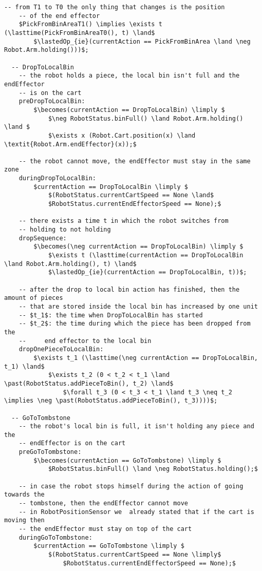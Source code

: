 \begin{lstlisting}[fontadjust, mathescape, frame=single]
    -- from T1 to T0 the only thing that changes is the position
    -- of the end effector
    $PickFromBinAreaT1() \implies \exists t (\lasttime(PickFromBinAreaT0(), t) \land$
        $\lastedOp_{ie}(currentAction == PickFromBinArea \land \neg Robot.Arm.holding()))$;
      
  -- DropToLocalBin
    -- the robot holds a piece, the local bin isn't full and the endEffector 
    -- is on the cart
    preDropToLocalBin:
        $\becomes(currentAction == DropToLocalBin) \limply $
            $\neg RobotStatus.binFull() \land Robot.Arm.holding() \land $
            $\exists x (Robot.Cart.position(x) \land \textit{Robot.Arm.endEffector}(x));$
    
    -- the robot cannot move, the endEffector must stay in the same zone
    duringDropToLocalBin:
        $currentAction == DropToLocalBin \limply $
            $(RobotStatus.currentCartSpeed == None \land$
            $RobotStatus.currentEndEffectorSpeed == None);$
  
    -- there exists a time t in which the robot switches from 
    -- holding to not holding
    dropSequence:
        $\becomes(\neg currentAction == DropToLocalBin) \limply $
            $\exists t (\lasttime(currentAction == DropToLocalBin \land Robot.Arm.holding(), t) \land$
            $\lastedOp_{ie}(currentAction == DropToLocalBin, t))$;

    -- after the drop to local bin action has finished, then the amount of pieces
    -- that are stored inside the local bin has increased by one unit
    -- $t_1$: the time when DropToLocalBin has started
    -- $t_2$: the time during which the piece has been dropped from the
    --     end effector to the local bin
    dropOnePieceToLocalBin:
        $\exists t_1 (\lasttime(\neg currentAction == DropToLocalBin, t_1) \land$
            $\exists t_2 (0 < t_2 < t_1 \land \past(RobotStatus.addPieceToBin(), t_2) \land$
                $\forall t_3 (0 < t_3 < t_1 \land t_3 \neq t_2 \implies \neg \past(RobotStatus.addPieceToBin(), t_3))))$;

  -- GoToTombstone
    -- the robot's local bin is full, it isn't holding any piece and the 
    -- endEffector is on the cart
    preGoToTombstone:
        $\becomes(currentAction == GoToTombstone) \limply $
            $RobotStatus.binFull() \land \neg RobotStatus.holding();$
    
    -- in case the robot stops himself during the action of going towards the 
    -- tombstone, then the endEffector cannot move 
    -- in RobotPositionSensor we  already stated that if the cart is moving then 
    -- the endEffector must stay on top of the cart
    duringGoToTombstone:
        $currentAction == GoToTombstone \limply $
            $(RobotStatus.currentCartSpeed == None \limply$ 
                $RobotStatus.currentEndEffectorSpeed == None);$




\end{lstlisting}
